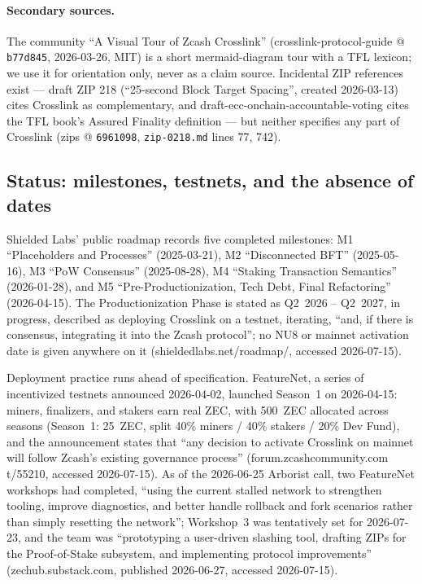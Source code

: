 \documentclass[11pt,a4paper]{article}
\theoremstyle{definition}
\begin{document}
\paragraph{Secondary sources.} The community ``A Visual Tour of Zcash
Crosslink'' (crosslink-protocol-guide @ \texttt{b77d845}, 2026-03-26,
MIT) is a short mermaid-diagram tour with a TFL lexicon; we use it for
orientation only, never as a claim source. Incidental ZIP references
exist --- draft ZIP 218 (``25-second Block Target Spacing'', created
2026-03-13) cites Crosslink as complementary, and
draft-ecc-onchain-accountable-voting cites the TFL book's Assured
Finality definition --- but neither specifies any part of Crosslink
(zips @ \texttt{6961098}, \texttt{zip-0218.md} lines 77, 742).

\subsection{Status: milestones, testnets, and the absence of
dates}\label{sec:xl-status}

Shielded Labs' public roadmap records five completed milestones: M1
``Placeholders and Processes'' (2025-03-21), M2 ``Disconnected BFT''
(2025-05-16), M3 ``PoW Consensus'' (2025-08-28), M4 ``Staking
Transaction Semantics'' (2026-01-28), and M5 ``Pre-Productionization,
Tech Debt, Final Refactoring'' (2026-04-15). The Productionization Phase
is stated as Q2~2026 -- Q2~2027, in progress, described as deploying
Crosslink on a testnet, iterating, ``and, if there is consensus,
integrating it into the Zcash protocol''; no NU8 or mainnet activation
date is given anywhere on it (shieldedlabs.net/roadmap/, accessed
2026-07-15).

Deployment practice runs ahead of specification. FeatureNet, a series of
incentivized testnets announced 2026-04-02, launched Season~1 on
2026-04-15: miners, finalizers, and stakers earn real ZEC, with 500~ZEC
allocated across seasons (Season~1: 25~ZEC, split 40\% miners / 40\%
stakers / 20\% Dev Fund), and the announcement states that ``any
decision to activate Crosslink on mainnet will follow Zcash's existing
governance process'' (forum.zcashcommunity.com t/55210, accessed
2026-07-15). As of the 2026-06-25 Arborist call, two FeatureNet
workshops had completed, ``using the current stalled network to
strengthen tooling, improve diagnostics, and better handle rollback and
fork scenarios rather than simply resetting the network''; Workshop~3
was tentatively set for 2026-07-23, and the team was ``prototyping a
user-driven slashing tool, drafting ZIPs for the Proof-of-Stake
subsystem, and implementing protocol improvements''
(zechub.substack.com, published 2026-06-27, accessed 2026-07-15).
\end{document}
